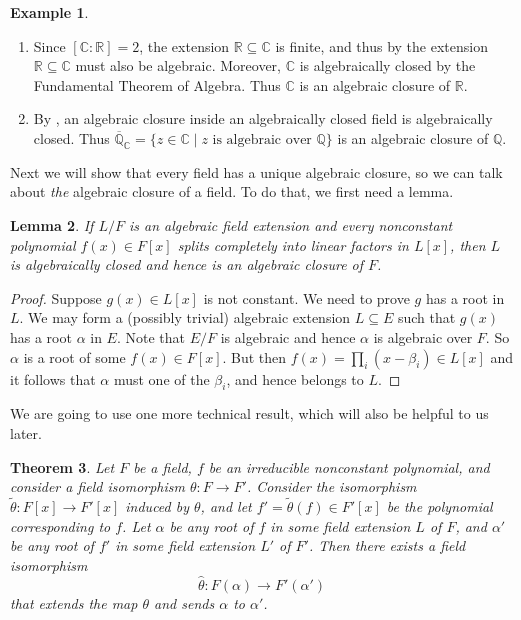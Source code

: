 \documentclass[12pt]{report}
\newtheorem{theorem}{Theorem}[chapter]
\newtheorem{lemma}[theorem]{Lemma}
\numberwithin{equation}{section}
\numberwithin{theorem}{chapter}
\theoremstyle{definition}
\newtheorem{example}[theorem]{Example}
\newtheorem*{basic properties}{Basic Properties}
\newtheorem*{Important Remark}{Important Remark}
\newcommand{\R}{\mathbb{R}}
\newcommand{\Q}{\mathbb{Q}}
\newcommand{\C}{\mathbb{C}}
\begin{document}
\begin{example}$\,$
\begin{enumerate}[label=\arabic*),leftmargin=15pt]
\item Since $[\C : \R]=2$, the extension $\R \subseteq \C$ is finite, and thus by  the extension $\R \subseteq \C$ must also be algebraic. Moreover, $\C$ is algebraically closed by the Fundamental Theorem of Algebra. Thus $\C$ is an algebraic closure of $\R$.
\item By , an algebraic closure inside an algebraically closed field is algebraically closed. Thus $\overline{\Q}_\C=\{ z \in \C \mid z \text{ is algebraic over } \Q \}$ is an algebraic closure of $\Q$.
\end{enumerate}
\end{example}


Next we will show that every field has a unique algebraic closure, so we can talk about \emph{the} algebraic closure of a field. To do that, we first need a lemma.

\begin{lemma}\label{lemma for existence and uniqueness of alg closures}
If $L/F$ is an algebraic field extension and every nonconstant polynomial $f(x) \in F[x]$ splits completely into linear factors in $L[x]$, then $L$ is algebraically closed and hence is an algebraic closure of $F$.
\end{lemma}

\begin{proof}
Suppose $g(x) \in L[x]$ is not constant. We need to prove $g$ has a root in $L$.
We may form a (possibly trivial) algebraic extension $L \subseteq E$ such that $g(x)$ has a root $\alpha$ in $E$. Note that $E/F$ is algebraic and hence $\alpha$ is algebraic over $F$. So $\alpha$ is a root of some $f(x) \in F[x]$. But then $f(x) = \prod_i (x - \beta_i) \in L[x]$ and it follows that $\alpha$ must one of the $\beta_i$, and hence belongs to $L$.
\end{proof}


We are going to use one more technical result, which will also be helpful to us later.


\begin{theorem}\label{extending identity on F to iso}
Let $F$ be a field, $f$ be an irreducible nonconstant polynomial, and consider a field isomorphism $\theta\!: F \to F'$. Consider the isomorphism $\tilde\theta\!:F[x] \to F'[x]$ induced by $\theta$, and let $f'=\tilde\theta(f) \in F'[x]$ be the polynomial corresponding to $f$. 
Let $\alpha$ be any root of $f$ in some field extension $L$ of $F$, and $\alpha'$ be any root of $f'$ in some
  field extension $L'$ of $F'$. Then there exists a field isomorphism
$$\widehat{\theta}: F(\alpha) \to F'(\alpha')$$
that extends the map $\theta$ and sends $\alpha$ to $\alpha'$.
\end{theorem}
\end{document}
